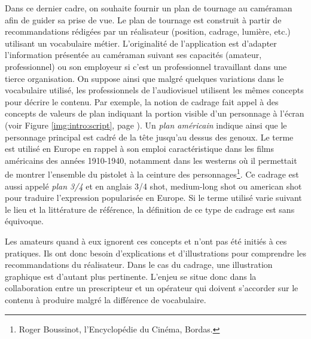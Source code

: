 Dans ce dernier cadre, on souhaite fournir un plan de tournage au caméraman afin de guider sa prise de vue. 
Le plan de tournage est construit à partir de recommandations rédigées par un réalisateur (position, cadrage, lumière, etc.) utilisant un vocabulaire métier. 
L'originalité de l'application est d'adapter l'information présentée au caméraman suivant ses capacités (amateur, professionnel) ou son employeur si c'est un professionnel travaillant dans une tierce organisation. 
On suppose ainsi que malgré quelques variations dans le vocabulaire utilisé, les professionnels de l'audiovisuel utilisent les mêmes concepts pour décrire le contenu. 
Par exemple, la notion de cadrage fait appel à des concepts de valeurs de plan indiquant la portion visible d'un personnage à l'écran (voir Figure \ref{img:intro:script}, page \pageref{img:intro:script}).
Un \textit{plan américain} indique ainsi que le personnage principal est cadré de la tête jusqu'au dessus des genoux. 
Le terme est utilisé en Europe en rappel à son emploi caractéristique dans les films américains des années 1910-1940, notamment dans les westerns où il permettait de montrer l'ensemble du pistolet à la ceinture des personnages\footnote{Roger Boussinot, l'Encyclopédie du Cinéma, Bordas.}. 
Ce cadrage est aussi appelé \textit{plan 3/4} et en anglais 3/4 shot, medium-long shot ou american shot pour traduire l'expression popularisée en Europe. 
Si le terme utilisé varie suivant le lieu et la littérature de référence, la définition de ce type de cadrage est sans équivoque. 


Les amateurs quand à eux ignorent ces concepts et n'ont pas été initiés à ces pratiques. Ils ont donc besoin d'explications et d'illustrations pour comprendre les recommandations du réalisateur. 
Dans le cas du cadrage, une illustration graphique est d'autant plus pertinente. 
L'enjeu se situe donc dans la collaboration entre un prescripteur et un opérateur qui doivent s'accorder sur le contenu à produire malgré la différence de vocabulaire. 




